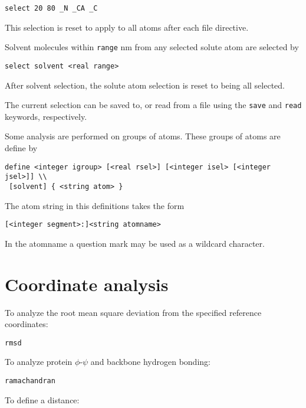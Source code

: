 \begin{verbatim}
select 20 80 _N _CA _C
\end{verbatim}

This selection is reset to apply to all atoms after each file
directive.

Solvent molecules within \verb+range+ nm from any selected solute atom
are selected by

\begin{verbatim}
select solvent <real range>
\end{verbatim}

After solvent selection, the solute atom selection is reset to being all
selected.

The current selection can be saved to, or read from a file using the 
\verb+save+ and \verb+read+ keywords, respectively.

\par

Some analysis are performed on groups of atoms. These groups of atoms
are define by

\begin{verbatim}
define <integer igroup> [<real rsel>] [<integer isel> [<integer jsel>]] \\
 [solvent] { <string atom> }
\end{verbatim}

The atom string in this definitions takes the form

\begin{verbatim}
[<integer segment>:]<string atomname>
\end{verbatim}

In the atomname a question mark may be used as a wildcard character.

\section{Coordinate analysis}

To analyze the root mean square deviation from the specified reference
coordinates:

\begin{verbatim}
rmsd
\end{verbatim}

To analyze protein $\phi$-$\psi$ and backbone hydrogen bonding:

\begin{verbatim}
ramachandran
\end{verbatim}

To define a distance:


